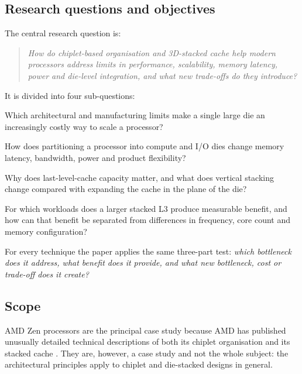 

\subsection{Research questions and objectives}
\label{sec:rq}

The central research question is:

\begin{quote}
\itshape How do chiplet-based organisation and 3D-stacked cache help modern processors address limits in performance, scalability, memory latency, power and die-level integration, and what new trade-offs do they introduce?
\end{quote}

It is divided into four sub-questions:

\begin{description}[leftmargin=1.2cm,style=nextline]
  \item[RQ1] Which architectural and manufacturing limits make a single large die an increasingly costly way to scale a processor?
  \item[RQ2] How does partitioning a processor into compute and I/O dies change memory latency, bandwidth, power and product flexibility?
  \item[RQ3] Why does last-level-cache capacity matter, and what does vertical stacking change compared with expanding the cache in the plane of the die?
  \item[RQ4] For which workloads does a larger stacked L3 produce measurable benefit, and how can that benefit be separated from differences in frequency, core count and memory configuration?
\end{description}

For every technique the paper applies the same three-part test: \emph{which bottleneck does it address, what benefit does it provide, and what new bottleneck, cost or trade-off does it create?}

\subsection{Scope}
\label{sec:scope}

AMD Zen processors are the principal case study because AMD has published unusually detailed technical descriptions of both its chiplet organisation and its stacked cache \cite{naffziger2020chiplet,suggs2019zen2,amd2022epyc7003,swaminathanAdvancedPackagingEnabling2021}. They are, however, a case study and not the whole subject: the architectural principles apply to chiplet and die-stacked designs in general.

